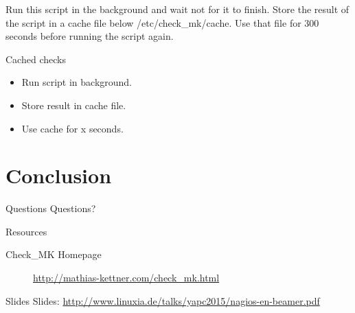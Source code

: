 Run this script in the background and wait not for it to finish.
Store the result of the script in a cache file below /etc/check\_mk/cache.
Use that file for 300 seconds before running the script again.

\begin{frame}{Cached checks}
\begin{itemize}
\item Run script in background.
\item Store result in cache file.
\item Use cache for x seconds.
\end{itemize}
\end{frame}

\section{Conclusion}

\begin{frame}{Questions}
Questions?
\end{frame}

\begin{frame}[fragile]{Resources}
\begin{description}
\item[Check\_MK Homepage] \url{http://mathias-kettner.com/check_mk.html}
\end{description}
\end{frame}

\begin{frame}{Slides}
Slides:
\url{http://www.linuxia.de/talks/yapc2015/nagios-en-beamer.pdf}
\end{frame}




